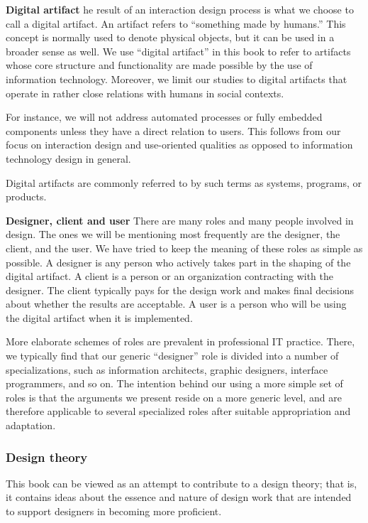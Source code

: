 \textbf{Digital artifact}
he result of an interaction design process is what we choose to call a digital artifact. An artifact refers to “something made by humans.” This concept is normally used to denote physical objects, but it can be used in a broader sense as well. We use “digital artifact” in this book to refer to artifacts whose core structure and functionality are made possible by the use of information technology. Moreover, we limit our studies to digital artifacts that operate in rather close relations with humans in social contexts.

For instance, we will not address automated processes or fully embedded components unless they have a direct relation to users. This follows from our focus on interaction design and use-oriented qualities as opposed to information technology design in general.

Digital artifacts are commonly referred to by such terms as systems, programs, or products.

\textbf{Designer, client and user}
There are many roles and many people involved in design. The ones we will be mentioning most frequently are the designer, the client, and the user. We have tried to keep the meaning of these roles as simple as possible. A designer is any person who actively takes part in the shaping of the digital artifact. A client is a person or an organization contracting with the designer. The client typically pays for the design work and makes final decisions about whether the results are acceptable. A user is a person who will be using the digital artifact when it is implemented.

More elaborate schemes of roles are prevalent in professional IT practice. There, we typically find that our generic “designer” role is divided into a number of specializations, such as information architects, graphic designers, interface programmers, and so on. The intention behind our using a more simple set of roles is that the arguments we present reside on a more generic level, and are therefore applicable to several specialized roles after suitable appropriation and adaptation.

\subsubsection{Design theory}
This book can be viewed as an attempt to contribute to a design theory; that is, it contains ideas about the essence and nature of design work that are intended to support designers in becoming more proficient.

